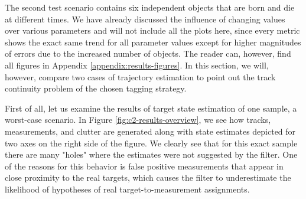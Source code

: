 
The second test scenario contains six independent objects that are born and die at different times. We have already discussed the influence of changing values over various parameters and will not include all the plots here, since every metric shows the exact same trend for all parameter values except for higher magnitudes of errors due to the increased number of objects. The reader can, however, find all figures in Appendix \ref{appendix:results-figures}. In this section, we will, however, compare two cases of trajectory estimation to point out the track continuity problem of the chosen tagging strategy.

First of all, let us examine the results of target state estimation of one sample, a worst-case scenario. In Figure \ref{fig:c2-results-overview}, we see how tracks, measurements, and clutter are generated along with state estimates depicted for two axes on the right side of the figure. We clearly see that for this exact sample there are many "holes" where the estimates were not suggested by the filter. One of the reasons for this behavior is false positive measurements that appear in close proximity to the real targets, which causes the filter to underestimate the likelihood of hypotheses of real target-to-measurement assignments.

